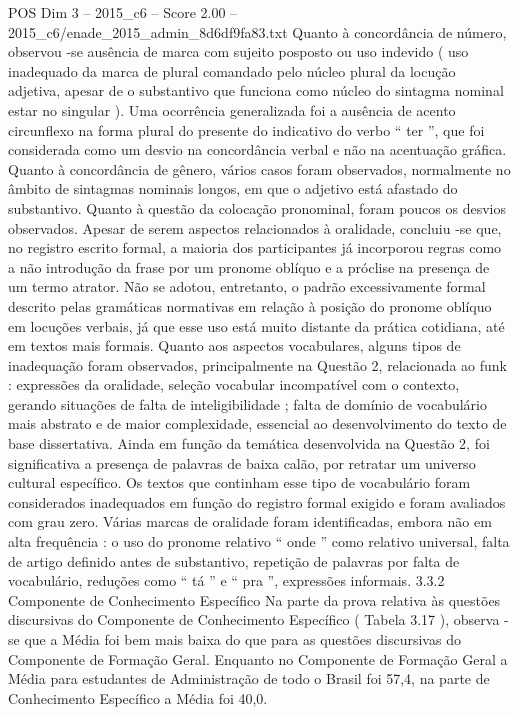 \begin{textsample}{POS Dim 3 – 2015\_c6 – Score 2.00 – 2015\_c6/enade\_2015\_admin\_8d6df9fa83.txt}
Quanto à concordância de número, observou -se ausência de marca com sujeito posposto ou uso indevido ( uso inadequado da marca de plural comandado pelo núcleo plural da locução adjetiva, apesar de o substantivo que funciona como núcleo do sintagma nominal estar no singular ).
Uma ocorrência generalizada foi a ausência de acento circunflexo na forma plural do presente do indicativo do verbo “ ter ”, que foi considerada como um desvio na concordância verbal e não na acentuação gráfica.
Quanto à concordância de gênero, vários casos foram observados, normalmente no âmbito de sintagmas nominais longos, em que o adjetivo está afastado do substantivo.
Quanto à questão da colocação pronominal, foram poucos os desvios observados.
Apesar de serem aspectos relacionados à oralidade, concluiu -se que, no registro escrito formal, a maioria dos participantes já incorporou regras como a não introdução da frase por um pronome oblíquo e a próclise na presença de um termo atrator.
Não se adotou, entretanto, o padrão excessivamente formal descrito pelas gramáticas normativas em relação à posição do pronome oblíquo em locuções verbais, já que esse uso está muito distante da prática cotidiana, até em textos mais formais.
Quanto aos aspectos vocabulares, alguns tipos de inadequação foram observados, principalmente na Questão 2, relacionada ao funk : expressões da oralidade, seleção vocabular incompatível com o contexto, gerando situações de falta de inteligibilidade ; falta de domínio de vocabulário mais abstrato e de maior complexidade, essencial ao desenvolvimento do texto de base dissertativa.
Ainda em função da temática desenvolvida na Questão 2, foi significativa a presença de palavras de baixa calão, por retratar um universo cultural específico.
Os textos que continham esse tipo de vocabulário foram considerados inadequados em função do registro formal exigido e foram avaliados com grau zero.
Várias marcas de oralidade foram identificadas, embora não em alta frequência : o uso do pronome relativo “ onde ” como relativo universal, falta de artigo definido antes de substantivo, repetição de palavras por falta de vocabulário, reduções como “ tá ” e “ pra ”, expressões informais. 3.3.2 Componente de Conhecimento Específico Na parte da prova relativa às questões discursivas do Componente de Conhecimento Específico ( Tabela 3.17 ), observa -se que a Média foi bem mais baixa do que para as questões discursivas do Componente de Formação Geral.
Enquanto no Componente de Formação Geral a Média para estudantes de Administração de todo o Brasil foi 57,4, na parte de Conhecimento Específico a Média foi 40,0.

\end{textsample}
